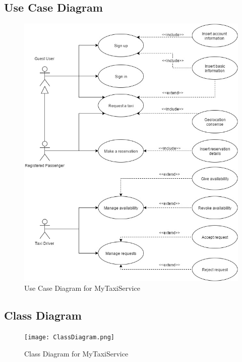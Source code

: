 	\subsection{Use Case Diagram}
		\begin{figure}[h!]
			\centering
			\graphicspath{ {../SE2_IMAGES/} }
			\includegraphics[width=\linewidth]{UseCase.jpg}
			\caption{Use Case Diagram for MyTaxiService}
		\end{figure}
	\newpage
	\subsection{Class Diagram}
		\begin{figure}[h!]
			\centering
			\graphicspath{ {../SE2_IMAGES/} }
			\texttt{[image: ClassDiagram.png]}
			\caption{Class Diagram for MyTaxiService}
		\end{figure}